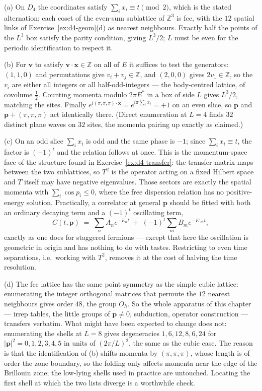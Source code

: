 {(a) On $D_4$ the coordinates satisfy $\sum_{i}x_i \equiv t \pmod 2$, which is
the stated alternation; each coset of the even-sum sublattice of $\mathbb{Z}^3$
is fcc, with the $12$ spatial links of Exercise~\ref{ex:d4-geom}(d) as nearest
neighbours. Exactly half the points of the $L^3$ box satisfy the parity
condition, giving $L^3/2$; $L$ must be even for the periodic identification to
respect it.

(b) For $\mathbf{v}$ to satisfy $\mathbf{v}\cdot\mathbf{x}\in\mathbb{Z}$ on all
of $E$ it suffices to test the generators: $(1,1,0)$ and permutations give
$v_i+v_j\in\mathbb{Z}$, and $(2,0,0)$ gives $2v_1\in\mathbb{Z}$, so the $v_i$
are either all integers or all half-odd-integers --- the body-centred lattice,
of covolume $\tfrac12$. Counting momenta modulo $2\pi E^{*}$ in a box of side
$L$ gives $L^3/2$, matching the sites. Finally
$e^{i(\pi,\pi,\pi)\cdot\mathbf{x}}=e^{i\pi\sum_i x_i}=+1$ on an even slice, so
$\mathbf{p}$ and $\mathbf{p}+(\pi,\pi,\pi)$ act identically there. (Direct
enumeration at $L=4$ finds $32$ distinct plane waves on $32$ sites, the
momenta pairing up exactly as claimed.)

(c) On an odd slice $\sum_i x_i$ is odd and the same phase is $-1$; since
$\sum_i x_i\equiv t$, the factor is $(-1)^t$ and the relation follows at once.
This is the momentum-space face of the structure found in
Exercise~\ref{ex:d4-transfer}: the transfer matrix maps between the two
sublattices, so $T^2$ is the operator acting on a fixed Hilbert space and $T$
itself may have negative eigenvalues. Those sectors are exactly the spatial
momenta with $\sum_i\cos p_i\le0$, where the free dispersion relation has no
positive-energy solution. Practically, a correlator at general $\mathbf{p}$
should be fitted with both an ordinary decaying term and a $(-1)^t$ oscillating
term,
\begin{equation}
  C(t,\mathbf{p}) \;=\; \sum_n A_n e^{-E_n t} \;+\; (-1)^t \sum_m B_m e^{-E'_m t},
\end{equation}
exactly as one does for staggered fermions --- except that here the oscillation
is geometric in origin and has nothing to do with tastes. Restricting to even
time separations, i.e.\ working with $T^2$, removes it at the cost of halving
the time resolution.

(d) The fcc lattice has the same point symmetry as the simple cubic lattice:
enumerating the integer orthogonal matrices that permute the $12$ nearest
neighbours gives order $48$, the group $O_h$. So the whole apparatus of this
chapter --- irrep tables, the little groups of $\mathbf{p}\neq0$, subduction,
operator construction --- transfers verbatim. What might have been expected to
change does not: enumerating the shells at $L=8$ gives degeneracies
$1,6,12,8,6,24$ for $|\mathbf{p}|^2 = 0,1,2,3,4,5$ in units of $(2\pi/L)^2$, the
same as the cubic case. The reason is that the identification of (b) shifts
momenta by $(\pi,\pi,\pi)$, whose length is of order the zone boundary, so the
folding only affects momenta near the edge of the Brillouin zone; the low-lying
shells used in practice are untouched. Locating the first shell at which the
two lists diverge is a worthwhile check.

}
